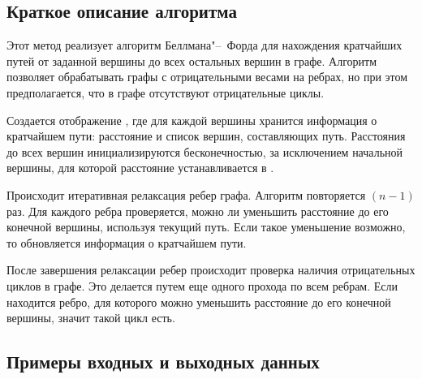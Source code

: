 \subsection{Краткое описание алгоритма}
Этот метод реализует алгоритм Беллмана"--~Форда для нахождения кратчайших путей от заданной вершины
 до всех остальных вершин в графе. Алгоритм позволяет обрабатывать графы
с отрицательными весами на ребрах, но при этом предполагается, что в графе отсутствуют отрицательные циклы.

Создается отображение , где для каждой вершины хранится информация о кратчайшем пути:
расстояние и список вершин, составляющих путь. Расстояния до всех вершин инициализируются бесконечностью,
за исключением начальной вершины, для которой расстояние устанавливается в .

Происходит итеративная релаксация ребер графа. Алгоритм повторяется $(n - 1)$ раз. Для каждого ребра
проверяется, можно ли уменьшить расстояние до его конечной вершины, используя текущий путь.
Если такое уменьшение возможно, то обновляется информация о кратчайшем пути.

После завершения релаксации ребер происходит проверка наличия отрицательных циклов в графе.
Это делается путем еще одного прохода по всем ребрам. Если находится ребро, для
которого можно уменьшить расстояние до его конечной вершины, значит такой цикл есть.

\subsection{Примеры входных и выходных данных}
